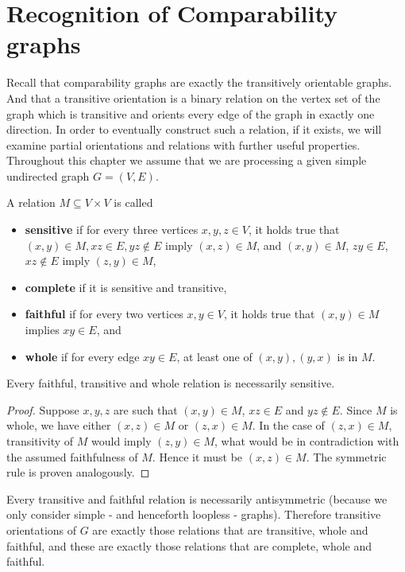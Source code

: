 \chapter{Recognition of Comparability graphs}

Recall that comparability graphs are exactly the transitively orientable graphs. And that a transitive orientation is a binary relation on the vertex set of the graph which is transitive and orients every edge of the graph in exactly one direction. In order to eventually construct such a relation, if it exists, we will examine partial orientations and relations with further useful properties. Throughout
this chapter we assume that we are processing a given simple undirected graph $G = (V, E)$.

\begin{defn}
	A relation $M \subseteq V \times V$ is called
	
	\begin{itemize}
		\item \textbf{sensitive} if for every three vertices $x, y, z \in V$, it holds true that $(x, y) \in M, xz \in E, yz \notin E$ imply $(x, z) \in M$, and $(x, y) \in M$, $zy \in E$, $xz \notin E$ imply $(z, y) \in M$,
		\item \textbf{complete} if it is sensitive and transitive,
		\item \textbf{faithful} if for every two vertices $x, y \in V$, it holds true that $(x, y) \in M$ implies $xy \in E$, and
		\item \textbf{whole} if for every edge $xy \in E$, at least one of $(x, y), (y, x)$ is in $M$.
	\end{itemize}
\end{defn}

\begin{observ}
	Every faithful, transitive and whole relation is necessarily sensitive.
\end{observ}

\begin{proof}
	Suppose $x, y, z$ are such that $(x, y) \in M$, $xz \in E$ and $yz \notin E$. Since $M$ is whole, we have either $(x, z) \in M$ or $(z, x) \in M$. In the case of $(z, x) \in M$, transitivity of $M$ would imply $(z, y) \in M$,	what would be in contradiction with the assumed faithfulness of $M$. Hence it must be $(x, z) \in M$. The symmetric rule is proven analogously.
\end{proof}

\begin{observ}
	Every transitive and faithful relation is necessarily antisymmetric (because we only consider simple - and henceforth loopless - graphs). Therefore transitive \\ orientations of $G$ are exactly those relations that are transitive, whole and faithful, and these are exactly those relations that are complete, whole and faithful.
\end{observ}

